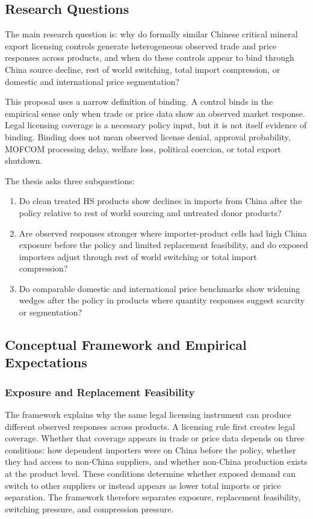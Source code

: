 \documentclass[12pt,a4paper]{article}
\numberwithin{equation}{section}
\begin{document}
\subsection{Research Questions}

The main research question is: why do formally similar Chinese critical mineral export licensing controls generate heterogeneous observed trade and price responses across products, and when do these controls appear to bind through China source decline, rest of world switching, total import compression, or domestic and international price segmentation?

This proposal uses a narrow definition of binding. A control binds in the empirical sense only when trade or price data show an observed market response. Legal licensing coverage is a necessary policy input, but it is not itself evidence of binding. Binding does not mean observed license denial, approval probability, MOFCOM processing delay, welfare loss, political coercion, or total export shutdown.

The thesis asks three subquestions:
\begin{enumerate}
\item Do clean treated HS products show declines in imports from China after the policy relative to rest of world sourcing and untreated donor products?
\item Are observed responses stronger where importer-product cells had high China exposure before the policy and limited replacement feasibility, and do exposed importers adjust through rest of world switching or total import compression?
\item Do comparable domestic and international price benchmarks show widening wedges after the policy in products where quantity responses suggest scarcity or segmentation?
\end{enumerate}

\subsection{Conceptual Framework and Empirical Expectations}

\subsubsection{Exposure and Replacement Feasibility}

The framework explains why the same legal licensing instrument can produce different observed responses across products. A licensing rule first creates legal coverage. Whether that coverage appears in trade or price data depends on three conditions: how dependent importers were on China before the policy, whether they had access to non-China suppliers, and whether non-China production exists at the product level. These conditions determine whether exposed demand can switch to other suppliers or instead appears as lower total imports or price separation. The framework therefore separates exposure, replacement feasibility, switching pressure, and compression pressure.
\end{document}
